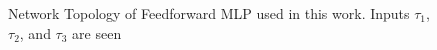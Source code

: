 \documentclass[twocolumn]{sagej}
\begin{document}
\begin{comment}
\begin{align}
\hat{r}_t = \lvert r_t \rvert \\
\tau_1 = MA_{\hat{r}_t} = \frac{1}{\omega_1}\hat{r}_{(t-\omega_1)} + \frac{1}{\omega_1}\hat{r}_{(t-\omega_1-1)} + \frac{1}{\omega_1}\hat{r}_{(t-\omega_1-2)} + \ldots + \nonumber \\
+ \frac{1}{\omega_1}\hat{r}_{(t)} + \ldots + \frac{1}{\omega_1}\hat{r}_{(t+\omega_1-2)} + \frac{1}{\omega_1}\hat{r}_{(t+\omega_1-1)} + \frac{1}{\omega_1}\hat{r}_{(t+\omega_1)}\\
	\tau_2 = \textit{slope}(MA_{\hat{r}_t}) = MA_{\hat{r}_t} - MA_{\hat{r}_(t-\omega_2)}\\
	\tau_3 = \textit{slope}(MA_{\hat{p}_t}) = MA_{{p}_t} - MA_{{p}_(t-\omega_2)}
\end{align}
\end{comment}

\begin{figure}[htbp]
\centering
{}
 \label{fig:io_diagram}
 \caption{Network Topology of Feedforward MLP used in this work. Inputs $\tau_1$, $\tau_2$, and $\tau_3$ are seen}

\end{figure}
\end{document}
